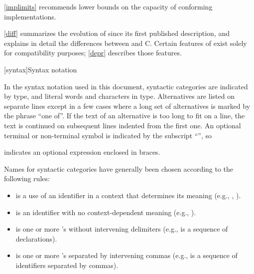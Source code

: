 \pnum
\ref{implimits} recommends lower bounds on the capacity of conforming
implementations.

\pnum
\ref{diff} summarizes the evolution of \Cpp{} since its first
published description, and explains in detail the differences between
\Cpp{} and C\@. Certain features of \Cpp{} exist solely for compatibility
purposes; \ref{depr} describes those features.

[syntax]{Syntax notation}

\pnum
{}%
In the syntax notation used in this document, syntactic
categories are indicated by  type, and literal words
and characters in   type. Alternatives are
listed on separate lines except in a few cases where a long set of
alternatives is marked by the phrase ``one of''. If the text of an alternative is too long to fit on a line, the text is continued on subsequent lines indented from the first one.
An optional terminal or non-terminal symbol is indicated by the subscript
``\opt{\relax}'', so
\begin{ncbnf}
\terminal{\{}  \terminal{\}}
\end{ncbnf}
indicates an optional expression enclosed in braces.%

\pnum
Names for syntactic categories have generally been chosen according to
the following rules:
\begin{itemize}
\item {} is a use of an identifier in a context that
determines its meaning (e.g., ,
).
\item {} is an identifier with no context-dependent meaning
(e.g., ).
\item {} is one or more 's without intervening
delimiters (e.g.,  is a sequence of
declarations).
\item {} is one or more 's separated by
intervening commas (e.g.,  is a sequence of
identifiers separated by commas).
\end{itemize}%
